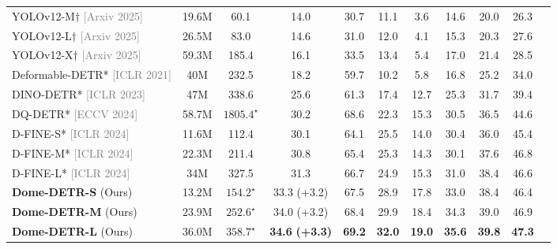 \begin{table}[ht]
\begin{tabular}{lcccccccccc}
        YOLOv12-M$\dagger$ \scriptsize \textcolor{gray}{[Arxiv 2025]} \normalsize \cite{tian2025yolov12}& 19.6M & 60.1  & 14.0  & 30.7  & 11.1  & 3.6  & 14.6  & 20.0  & 26.3  \\
        YOLOv12-L$\dagger$ \scriptsize \textcolor{gray}{[Arxiv 2025]} \normalsize \cite{tian2025yolov12}& 26.5M & 83.0  & 14.6  & 31.0  & 12.0  & 4.1  & 15.3  & 20.3  & 27.6  \\
        YOLOv12-X$\dagger$ \scriptsize \textcolor{gray}{[Arxiv 2025]} \normalsize \cite{tian2025yolov12}& 59.3M & 185.4 & 16.1  & 33.5  & 13.4  & 5.4  & 17.0  & 21.4  & 28.5  \\
        Deformable-DETR* \scriptsize \textcolor{gray}{[ICLR 2021]} \normalsize \cite{zhu2020deformable}& 40M & 232.5    & 18.2  & 59.7  & 10.2  & 5.8   & 16.8  & 25.2  & 34.0  \\
        DINO-DETR* \scriptsize \textcolor{gray}{[ICLR 2023]} \normalsize \cite{zhang2022dino}& 47M  & 338.6    & 25.6  & 61.3  & 17.4  & 12.7  & 25.3  & 31.7  & 39.4  \\
        DQ-DETR* \scriptsize \textcolor{gray}{[ECCV 2024]} \normalsize \cite{huang2024dq}& 58.7M & $1805.4^{\star}$ & 30.2  & 68.6  & 22.3  & 15.3  & 30.5  & 36.5  & 44.6  \\
        D-FINE-S* \scriptsize \textcolor{gray}{[ICLR 2024]} \normalsize \cite{peng2024d}& 11.6M & 112.4 & 30.1  & 64.1  & 25.5  & 14.0  & 30.4  & 36.0  & 45.4  \\
        D-FINE-M* \scriptsize \textcolor{gray}{[ICLR 2024]} \normalsize \cite{peng2024d}& 22.3M & 211.4 & 30.8  & 65.4  & 25.3  & 14.3  & 30.1  & 37.6  & 46.8  \\
        D-FINE-L* \scriptsize \textcolor{gray}{[ICLR 2024]} \normalsize \cite{peng2024d}& 34M   & 327.5 & 31.3    & 66.7    & 24.9    & 15.3    & 31.0    & 38.4    & 46.6    \\
        \rowcolor[HTML]{F5F5F5} \textbf{Dome-DETR-S} (Ours) & 13.2M & $154.2^{\star}$    & 33.3 \color{purple}(+3.2)    & 67.5    & 28.9    & 17.8    & 33.0    & 38.4    & 46.4    \\
        \rowcolor[HTML]{EBEBEB} \textbf{Dome-DETR-M} (Ours) & 23.9M & $252.6^{\star}$    & 34.0 \color{purple}(+3.2) & 68.4  & 29.9  & 18.4  & 34.3  & 39.0  & 46.9  \\
        \rowcolor[HTML]{E1E1E1} \textbf{Dome-DETR-L} (Ours) & 36.0M & $358.7^{\star}$ & \textbf{34.6} \color{purple}\textbf{(+3.3)} & \textbf{69.2}  & \textbf{32.0}  & \textbf{19.0}  & \textbf{35.6}  & \textbf{39.8}  & \textbf{47.3}  \\
        \bottomrule
    \end{tabular}
    \label{tab:main}
\end{table}
